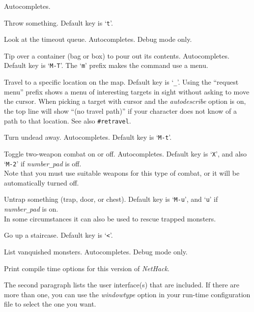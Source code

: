 Autocompletes.
\item[\tb{\#throw}]
Throw something. Default key is `{\tt t}'.
\item[\tb{\#timeout}]
Look at the timeout queue.
Autocompletes.
Debug mode only.
\item[\tb{\#tip}]
Tip over a container (bag or box) to pour out its contents.
Autocompletes. Default key is `{\tt M-T}'.
The `{\tt m}' prefix makes the command use a menu.
\item[\tb{\#travel}]
Travel to a specific location on the map.
Default key is `{\tt \verb+_+}'.
Using the ``request menu'' prefix shows a menu of interesting targets in sight
without asking to move the cursor.
When picking a target with cursor and the {\it autodescribe\/}
option is on, the top line will show ``(no travel path)'' if
your character does not know of a path to that location.
See also {\tt \#retravel}.
\item[\tb{\#turn}]
Turn undead away. Autocompletes. Default key is `{\tt M-t}'.
\item[\tb{\#twoweapon}]
Toggle two-weapon combat on or off. Autocompletes.
Default key is `{\tt X}',
and also `{\tt M-2}' if {\it number\verb+_+pad\/} is off.\\
Note that you must
use suitable weapons for this type of combat, or it will
be automatically turned off.
\item[\tb{\#untrap}]
Untrap something (trap, door, or chest).
Default key is `{\tt M-u}', and `{\tt u}' if {\it number\verb+_+pad\/} is on.\\
In some circumstances it can also be used to rescue trapped monsters.
\item[\tb{\#up}]
Go up a staircase. Default key is `{\tt <}'.
\item[\tb{\#vanquished}]
List vanquished monsters.
Autocompletes.
Debug mode only.
\item[\tb{\#version}]
Print compile time options for this version of {\it NetHack\/}.

The second paragraph lists the user interface(s) that are included.
If there are more than one, you can use the {\it windowtype\/}
option in your run-time configuration file to select the one you want.

